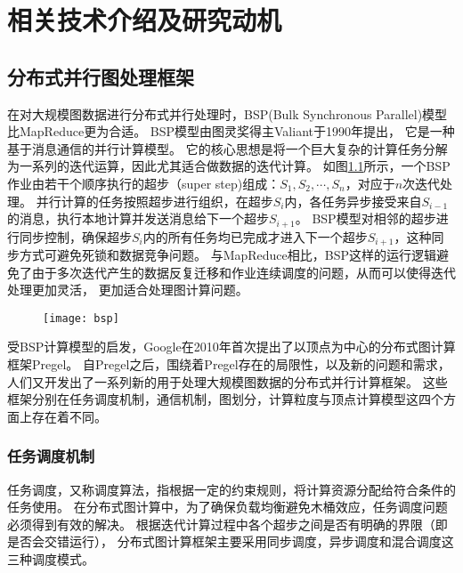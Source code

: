 \chapter{相关技术介绍及研究动机}
\section{分布式并行图处理框架}
在对大规模图数据进行分布式并行处理时，BSP(Bulk Synchronous Parallel)模型\cite{bsp@1990}比MapReduce更为合适。
BSP模型由图灵奖得主Valiant于1990年提出，
它是一种基于消息通信的并行计算模型。
它的核心思想是将一个巨大复杂的计算任务分解为一系列的迭代运算，因此尤其适合做数据的迭代计算。
如图\ref{fig:bsp}所示，一个BSP作业由若干个顺序执行的超步（super step)组成：$S_1,S_2,\cdots,S_n$，对应于$n$次迭代处理。
并行计算的任务按照超步进行组织，在超步$S_i$内，各任务异步接受来自$S_{i-1}$的消息，执行本地计算并发送消息给下一个超步$S_{i+1}$。
BSP模型对相邻的超步进行同步控制，确保超步$S_i$内的所有任务均已完成才进入下一个超步$S_{i+1}$，这种同步方式可避免死锁和数据竞争问题。
与MapReduce相比，BSP这样的运行逻辑避免了由于多次迭代产生的数据反复迁移和作业连续调度的问题，从而可以使得迭代处理更加灵活，
更加适合处理图计算问题。
\begin{figure}[!htbp]
  \centering
  \texttt{[image: bsp]}
  \label{fig:bsp}
\end{figure}

受BSP计算模型的启发，Google在2010年首次提出了以顶点为中心的分布式图计算框架Pregel\cite{Malewicz@SIGMOD10}。
自Pregel之后，围绕着Pregel存在的局限性，以及新的问题和需求，人们又开发出了一系列新的用于处理大规模图数据的分布式并行计算框架。
这些框架分别在任务调度机制，通信机制，图划分，计算粒度与顶点计算模型这四个方面上存在着不同\cite{TLV, reviewruc}。

\subsection{任务调度机制}
任务调度，又称调度算法，指根据一定的约束规则，将计算资源分配给符合条件的任务使用。
在分布式图计算中，为了确保负载均衡避免木桶效应，任务调度问题必须得到有效的解决。
根据迭代计算过程中各个超步之间是否有明确的界限（即是否会交错运行），
分布式图计算框架主要采用同步调度，异步调度和混合调度这三种调度模式。

